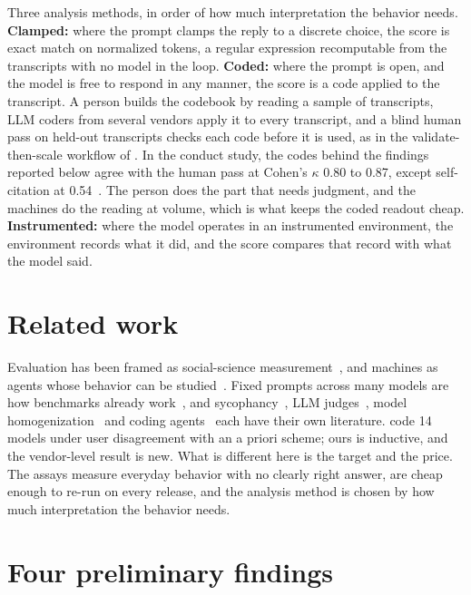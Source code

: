 Three analysis methods, in order of how much interpretation the behavior needs. \textbf{Clamped:} where the prompt clamps the reply to a discrete choice, the score is exact match on normalized tokens, a regular expression recomputable from the transcripts with no model in the loop. \textbf{Coded:} where the prompt is open, and the model is free to respond in any manner, the score is a code applied to the transcript. A person builds the codebook by reading a sample of transcripts, LLM coders from several vendors apply it to every transcript, and a blind human pass on held-out transcripts checks each code before it is used, as in the
validate-then-scale workflow of \citet{chew2023laca}. In the conduct study, the codes behind the findings reported below agree with the human pass at Cohen's $\kappa$ 0.80 to 0.87, except self-citation at 0.54~\citep{parikh2026conduct}. The person does the part that needs judgment, and the machines do the reading at volume, which is what keeps the coded readout cheap. \textbf{Instrumented:} where the model operates in an instrumented environment, the environment records what it did, and the score compares that record with what the model said. 

\section{Related work}
\label{sec:related}

Evaluation has been framed as social-science measurement~\citep{wallach2025position}, and machines as agents whose behavior can be studied~\citep{rahwan2019machine}. Fixed prompts across many models are how benchmarks already work~\citep{liang2022helm}, and sycophancy~\citep{perez2022discovering,sharma2023sycophancy}, LLM judges~\citep{zheng2023judging}, model homogenization~\citep{kleinberg2021monoculture,bommasani2022picking} and coding agents~\citep{jimenez2024swebench} each have their own literature. \citet{alnasser2026authority} code 14 models under user disagreement with an a priori scheme; ours is inductive, and the vendor-level result is new. What is different here is the target and the price. The assays measure everyday behavior with no clearly right answer, are cheap enough to re-run on every release, and the analysis method is chosen by how much interpretation the behavior needs.

\section{Four preliminary findings}
\label{sec:findings}

